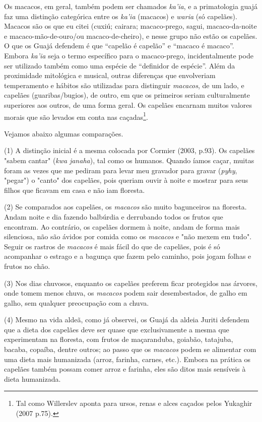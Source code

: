 Os macacos, em geral, também podem ser chamados \emph{ka'ia}, e a
primatologia guajá faz uma distinção categórica entre os \emph{ka'ia}
(macacos) e \emph{waria} (só capelães). Macacos são os que eu citei
(cuxiú; cairara; macaco-prego, sagui, macaco-da-noite e
macaco-mão-de-ouro/ou macaco-de-cheiro), e nesse grupo não estão os
capelães. O que os Guajá defendem é que ``capelão é capelão'' e ``macaco
é macaco''. Embora \emph{ka'ia} seja o termo específico para o
macaco-prego, incidentalmente pode ser utilizado também como uma espécie
de ``definidor de espécie''. Além da proximidade mitológica e musical,
outras diferenças que envolveriam temperamento e hábitos são utilizadas
para distinguir \emph{macacos}, de um lado, e capelães
(guaribas/bugios), de outro, em que os primeiros seriam culturalmente
superiores aos outros, de uma forma geral. Os capelães encarnam muitos
valores morais que são levados em conta nas caçadas\footnote{Tal como
  Willerslev aponta para ursos, renas e alces caçados pelos Yukaghir
  (2007 p.75).}.

Vejamos abaixo algumas comparações.

(1) A distinção inicial é a mesma colocada por Cormier (2003, p.93). Os
capelães "sabem cantar" (\emph{kwa} \emph{janaha}), tal como os humanos.
Quando íamos caçar, muitas foram as vezes que me pediram para levar meu
gravador para gravar (\emph{pyhy}, "pegar") o "canto" dos capelães, pois
queriam ouvir à noite e mostrar para seus filhos que ficavam em casa e
não iam floresta.

(2) Se comparados aos capelães, os \emph{macacos} são muito bagunceiros
na floresta. Andam noite e dia fazendo balbúrdia e derrubando todos os
frutos que encontram. Ao contrário, os capelães dormem à noite, andam de
forma mais silenciosa, não são ávidos por comida como os \emph{macacos}
e "não mexem em tudo". Seguir os rastros de \emph{macacos} é mais fácil
do que de capelães, pois é só acompanhar o estrago e a bagunça que fazem
pelo caminho, pois jogam folhas e frutos no chão.

(3) Nos dias chuvosos, enquanto os capelães preferem ficar protegidos
nas árvores, onde tomem menos chuva, os \emph{macacos} podem sair
desembestados, de galho em galho, sem qualquer preocupação com a chuva.

(4) Mesmo na vida aldeã, como já observei, os Guajá da aldeia Juriti
defendem que a dieta dos capelães deve ser quase que exclusivamente a
mesma que experimentam na floresta, com frutos de maçaranduba, goiabão,
tatajuba, bacaba, copaíba, dentre outros; ao passo que os \emph{macacos}
podem se alimentar com uma dieta mais humanizada (arroz, farinha,
carnes, etc.). Embora na prática os capelães também possam comer arroz e
farinha, eles são ditos mais sensíveis à dieta humanizada.

